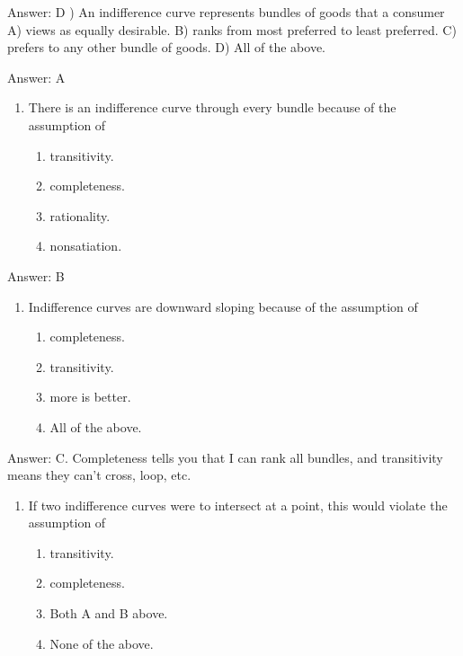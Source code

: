 \documentclass[11pt,]{article}
\providecommand{\tightlist}{%
  \setlength{\itemsep}{0pt}\setlength{\parskip}{0pt}}
\begin{document}
Answer: D ) An indifference curve represents bundles of goods that a consumer A)
views as equally desirable. B) ranks from most preferred to least
preferred. C) prefers to any other bundle of goods. D) All of the above.

Answer: A

\begin{enumerate}
\def\labelenumi{\arabic{enumi})}
\setcounter{enumi}{6}
\tightlist
\item
  There is an indifference curve through every bundle because of the
  assumption of

  \begin{enumerate}
  \def\labelenumii{\Alph{enumii})}
  \tightlist
  \item
    transitivity.
  \item
    completeness.
  \item
    rationality.
  \item
    nonsatiation.
  \end{enumerate}
\end{enumerate}

Answer: B

\begin{enumerate}
\def\labelenumi{\arabic{enumi})}
\setcounter{enumi}{7}
\tightlist
\item
  Indifference curves are downward sloping because of the assumption of

  \begin{enumerate}
  \def\labelenumii{\Alph{enumii})}
  \tightlist
  \item
    completeness.
  \item
    transitivity.
  \item
    more is better.
  \item
    All of the above.
  \end{enumerate}
\end{enumerate}

Answer: C. Completeness tells you that I can rank all bundles, and
transitivity means they can't cross, loop, etc.

\begin{enumerate}
\def\labelenumi{\arabic{enumi})}
\setcounter{enumi}{8}
\tightlist
\item
  If two indifference curves were to intersect at a point, this would
  violate the assumption of

  \begin{enumerate}
  \def\labelenumii{\Alph{enumii})}
  \tightlist
  \item
    transitivity.
  \item
    completeness.
  \item
    Both A and B above.
  \item
    None of the above.
  \end{enumerate}
\end{enumerate}
\end{document}
